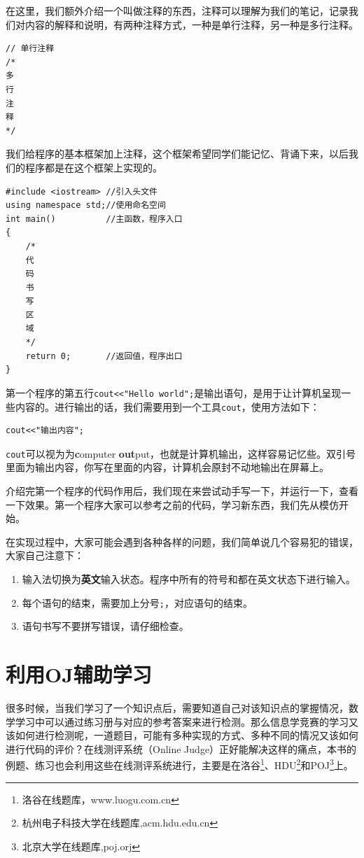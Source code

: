 在这里，我们额外介绍一个叫做注释的东西，注释可以理解为我们的笔记，记录我们对内容的解释和说明，有两种注释方式，一种是单行注释，另一种是多行注释。
\begin{verbatim}
// 单行注释
/*
多
行
注
释
*/
\end{verbatim}
我们给程序的基本框架加上注释，这个框架希望同学们能记忆、背诵下来，以后我们的程序都是在这个框架上实现的。
\begin{mbdm}
\begin{verbatim}
#include <iostream> //引入头文件
using namespace std;//使用命名空间
int main()          //主函数，程序入口
{
	/*
	代
	码
	书
	写
	区
	域
	*/
	return 0;       //返回值，程序出口
}
\end{verbatim}
\end{mbdm}
第一个程序的第五行\texttt{cout<<"Hello world";}是输出语句，是用于让计算机呈现一些内容的。进行输出的话，我们需要用到一个工具\texttt{cout}，使用方法如下：
\begin{verbatim}
cout<<"输出内容";
\end{verbatim}
\texttt{cout}可以视为为\textbf{c}omputer \textbf{out}put，也就是计算机输出，这样容易记忆些。双引号里面为输出内容，你写在里面的内容，计算机会原封不动地输出在屏幕上。

介绍完第一个程序的代码作用后，我们现在来尝试动手写一下，并运行一下，查看一下效果。第一个程序大家可以参考之前的代码，学习新东西，我们先从模仿开始。

在实现过程中，大家可能会遇到各种各样的问题，我们简单说几个容易犯的错误，大家自己注意下：
\begin{enumerate}
\item 输入法切换为\textbf{英文}输入状态。程序中所有的符号和都在英文状态下进行输入。
\item 每个语句的结束，需要加上分号\texttt{;}，对应语句的结束。
\item 语句书写不要拼写错误，请仔细检查。
\end{enumerate}

\section{利用OJ辅助学习}
很多时候，当我们学习了一个知识点后，需要知道自己对该知识点的掌握情况，数学学习中可以通过练习册与对应的参考答案来进行检测。那么信息学竞赛的学习又该如何进行检测呢，一道题目，可能有多种实现的方式、多种不同的情况又该如何进行代码的评价？在线测评系统（Online Judge）正好能解决这样的痛点，本书的例题、练习也会利用这些在线测评系统进行，主要是在洛谷\footnote{洛谷在线题库，www.luogu.com.cn}、HDU\footnote{杭州电子科技大学在线题库,acm.hdu.edu.cn}和POJ\footnote{北京大学在线题库,poj.orj}上。

